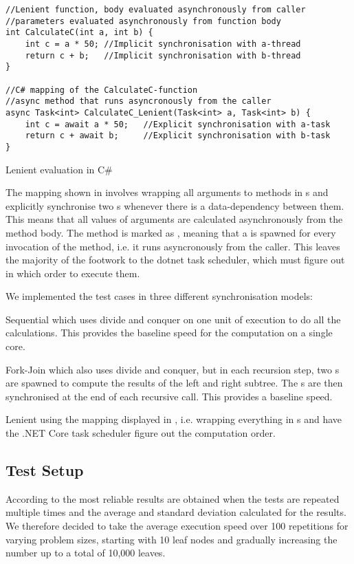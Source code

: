 \begin{listing}[H]
\begin{verbatim}
//Lenient function, body evaluated asynchronously from caller
//parameters evaluated asynchronously from function body
int CalculateC(int a, int b) {
    int c = a * 50; //Implicit synchronisation with a-thread
    return c + b;   //Implicit synchronisation with b-thread
}

//C# mapping of the CalculateC-function
//async method that runs asyncronously from the caller
async Task<int> CalculateC_Lenient(Task<int> a, Task<int> b) {
    int c = await a * 50;   //Explicit synchronisation with a-task
    return c + await b;     //Explicit synchronisation with b-task
}
\end{verbatim}
\caption{Lenient evaluation in C\#} \label{lst:lenient:to:task}
\end{listing}
The mapping shown in  involves wrapping all arguments to methods in s and explicitly synchronise two s whenever there is a data-dependency between them. This means that all values of arguments are calculated asynchronously from the method body. The method is marked as , meaning that a  is spawned for every invocation of the method, i.e. it runs asyncronously from the caller. This leaves the majority of the footwork to the dotnet task scheduler, which must figure out in which order to execute them.

We implemented the test cases in three different synchronisation models:
\begin{labeling}{\quad\quad}
    \item[Sequential] which uses divide and conquer on one unit of execution to do all the calculations. This provides the baseline speed for the computation on a single core.
    \item[Fork-Join] which also uses divide and conquer, but in each recursion step, two s are spawned to compute the results of the left and right subtree. The s are then synchronised at the end of each recursive call. This provides a \textit{} baseline speed.
    \item[Lenient] using the mapping displayed in , i.e. wrapping everything in s and have the .NET Core task scheduler figure out the computation order.
\end{labeling}

\subsection{Test Setup}
According to \cite{sestoft2013microbenchmarks} the most reliable results are obtained when the tests are repeated multiple times and the average and standard deviation calculated for the results. We therefore decided to take the average execution speed over 100 repetitions for varying problem sizes, starting with 10 leaf nodes and gradually increasing the number up to a total of 10,000 leaves.

